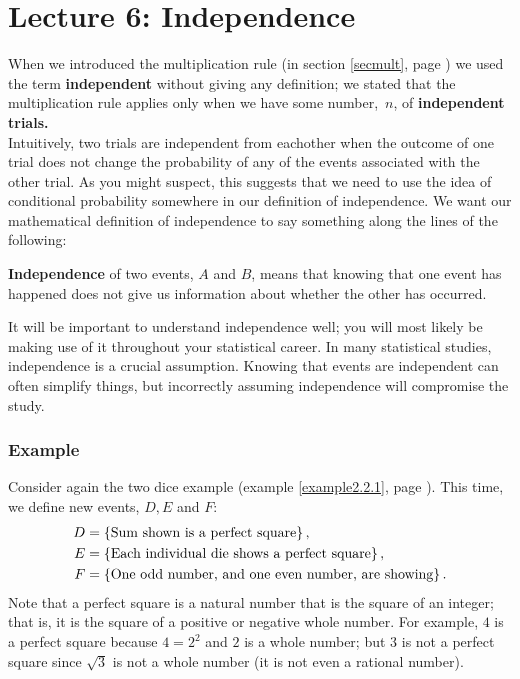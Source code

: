 
\chapter{Lecture 6: Independence} \label{independence}
When we introduced the multiplication rule (in section \ref{secmult}, page \pageref{secmult}) we used the term \textbf{independent} without giving any definition; we stated that the multiplication rule applies only when we have some number,~$n$, of \textbf{independent trials.}  \\

\noindent Intuitively, two trials are independent from eachother when the outcome of one trial does not change the probability of any of the events associated with the other trial. As you might suspect, this suggests that we need to use the idea of conditional probability somewhere in our definition of independence. We want our mathematical definition of independence to say something along the lines of the following:
\bigskip
\begin{center}
\begin{minipage}{0.6\columnwidth}{

\vskip 0.02cm
\begin{center}
\textbf{Independence} of two events, $A$ and $B$, means that knowing that one event has happened does not give us information about whether the other has occurred.
\end{center}
}
\end{minipage}
\end{center}
\bigskip

\noindent It will be important to understand independence well; you will most likely be making use of it throughout your statistical career. In many statistical studies, independence is a crucial assumption. Knowing that events are independent can often simplify things, but incorrectly assuming independence will compromise the study.

\subsection{Example} \label{ex604}
Consider again the two dice example (example \ref{example2.2.1}, page \pageref{example2.2.1}). This time, we define new events, $D,E$ and $F$:
\begin{align*}
D & = \left\{\text{Sum shown is a perfect square}\right\}, \\ 
E & = \left\{\text{Each individual die shows a perfect square}\right\}, \\ 
F & = \left\{\text{One odd number, and one even number, are showing}\right\}.
\end{align*}
Note that a perfect square is a natural number that is the square of an integer; that is, it is the square of a positive or negative whole number. For example, $4$ is a perfect square because $4 = 2^2$ and $2$ is a whole number; but $3$ is not a perfect square since $\sqrt{3}$ is not a whole number (it is not even a rational number).\\

